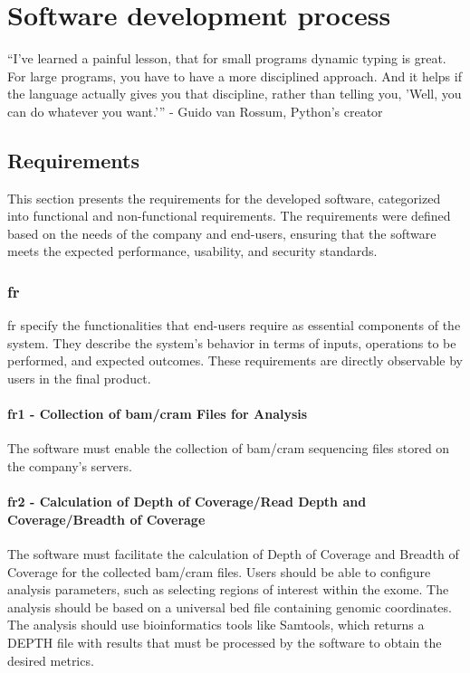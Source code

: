 \chapter{Software development process}
\label{chapter:Analysis tool}

\begin{introduction}
    “I've learned a painful lesson, that for small programs dynamic typing is great. For large programs, you have to have a more disciplined approach. And it helps if the language actually gives you that discipline, rather than telling you, 'Well, you can do whatever you want.'” - Guido van Rossum, Python's creator
\end{introduction}

\section{Requirements}

This section presents the requirements for the developed software, categorized into functional and non-functional requirements. The requirements were defined based on the needs of the company and end-users, ensuring that the software meets the expected performance, usability, and security standards.
\subsection{\acl{fr}}

\ac{fr} specify the functionalities that end-users require as essential components of the system. They describe the system's behavior in terms of inputs, operations to be performed, and expected outcomes. These requirements are directly observable by users in the final product. \cite{Geeks2024}

\subsubsection{\textbf{\ac{fr}1 - Collection of \ac{bam}/\ac{cram} Files for Analysis}}

The software must enable the collection of \ac{bam}/\ac{cram} sequencing files stored on the company's servers.

\subsubsection{\textbf{\ac{fr}2 - Calculation of Depth of Coverage/Read Depth and Coverage/Breadth of Coverage}}

The software must facilitate the calculation of Depth of Coverage and Breadth of Coverage for the collected \ac{bam}/\ac{cram} files. Users should be able to configure analysis parameters, such as selecting regions of interest within the exome. The analysis should be based on a universal \ac{bed} file containing genomic coordinates. The analysis should use bioinformatics tools like Samtools, which returns a DEPTH file with results that must be processed by the software to obtain the desired metrics.

